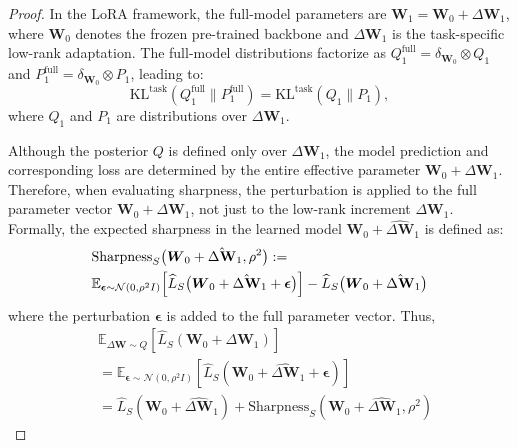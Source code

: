 \documentclass[letterpaper]{article} %
\begin{document}
\begin{proof}
In the LoRA framework, the full-model parameters are $\boldsymbol{W}_1 = \boldsymbol{W}_0 + \Delta\boldsymbol{W}_1$, where $\boldsymbol{W}_0$ denotes the frozen pre-trained backbone and $\Delta\boldsymbol{W}_1$ is the task-specific low-rank adaptation. The full-model distributions factorize as $Q_1^{\text{full}} = \delta_{\boldsymbol{W}_0} \otimes Q_1$ and $P_1^{\text{full}} = \delta_{\boldsymbol{W}_0} \otimes P_1$, leading to:
\begin{equation}
    \text{KL}^{\text{task}}(Q_1^{\text{full}} \| P_1^{\text{full}}) = \text{KL}^{\text{task}}(Q_1 \| P_1),
\end{equation}
where $Q_1$ and $P_1$ are distributions over $\Delta\boldsymbol{W}_1$. 


Although the posterior $Q$ is defined only over $\Delta\boldsymbol{W}_1$, the model prediction and corresponding loss are determined by the entire effective parameter $\boldsymbol{W}_0 + \Delta\boldsymbol{W}_1$. Therefore, when evaluating sharpness, the perturbation is applied to the full parameter vector $\boldsymbol{W}_0 + \Delta\boldsymbol{W}_1$, not just to the low-rank increment $\Delta\boldsymbol{W}_1$. Formally, the expected sharpness in the learned model $\boldsymbol{W}_0 + \hat{\Delta\boldsymbol{W}}_1$ is defined as:
\begin{equation}
\begin{aligned}
&\mathrm{Sharpness}_S\big(\boldsymbol{W}_0 + \hat{\Delta\mathbf{W}}_1, \rho^2\big) := \\
&\mathbb{E}_{\boldsymbol{\epsilon} \sim \mathcal{N}(0, \rho^2 I)} \Big[
    \widehat{L}_S\big(\boldsymbol{W}_0 + \hat{\Delta\mathbf{W}}_1 + \boldsymbol{\epsilon}\big)
\Big] - \widehat{L}_S\big(\boldsymbol{W}_0 + \hat{\Delta\mathbf{W}}_1\big) 
\notag
\end{aligned}
\end{equation}
where the perturbation $\boldsymbol{\epsilon}$ is added to the full parameter vector. Thus,
\begin{equation}
    \begin{aligned}
    &\mathbb{E}_{\Delta\mathbf{W} \sim Q}[\widehat{L}_S(\mathbf{W}_0 + \Delta\mathbf{W}_1)] \\
    &= \mathbb{E}_{\boldsymbol{\epsilon} \sim \mathcal{N}(0, \rho^2 I)}[\widehat{L}_S(\mathbf{W}_0 + \hat{\Delta\mathbf{W}}_1 + \boldsymbol{\epsilon})]  \\
    &=\widehat{L}_S(\mathbf{W}_0 + \hat{\Delta\mathbf{W}}_1) + \mathrm{Sharpness}_S(\mathbf{W}_0+\hat{\Delta\mathbf{W}}_1, \rho^2)
\end{aligned}
\end{equation}



\end{proof}
\end{document}

